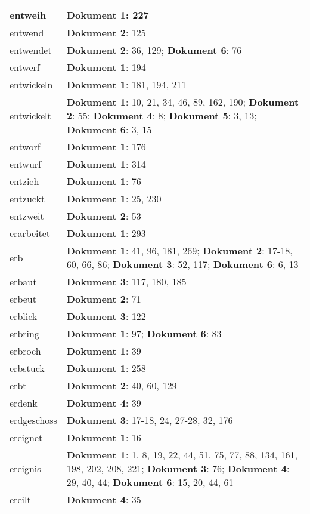 \documentclass[a5paper]{article}
\begin{document}
\begin{longtable}[l]{|l|p{3in}|}
\hline
entweih & \textbf{Dokument 1}: 227 \\
\hline
entwend & \textbf{Dokument 2}: 125 \\
\hline
entwendet & \textbf{Dokument 2}: 36, 129; \textbf{Dokument 6}: 76 \\
\hline
entwerf & \textbf{Dokument 1}: 194 \\
\hline
entwickeln & \textbf{Dokument 1}: 181, 194, 211 \\
\hline
entwickelt & \textbf{Dokument 1}: 10, 21, 34, 46, 89, 162, 190; \textbf{Dokument 2}: 55; \textbf{Dokument 4}: 8; \textbf{Dokument 5}: 3, 13; \textbf{Dokument 6}: 3, 15 \\
\hline
entworf & \textbf{Dokument 1}: 176 \\
\hline
entwurf & \textbf{Dokument 1}: 314 \\
\hline
entzieh & \textbf{Dokument 1}: 76 \\
\hline
entzuckt & \textbf{Dokument 1}: 25, 230 \\
\hline
entzweit & \textbf{Dokument 2}: 53 \\
\hline
erarbeitet & \textbf{Dokument 1}: 293 \\
\hline
erb & \textbf{Dokument 1}: 41, 96, 181, 269; \textbf{Dokument 2}: 17-18, 60, 66, 86; \textbf{Dokument 3}: 52, 117; \textbf{Dokument 6}: 6, 13 \\
\hline
erbaut & \textbf{Dokument 3}: 117, 180, 185 \\
\hline
erbeut & \textbf{Dokument 2}: 71 \\
\hline
erblick & \textbf{Dokument 3}: 122 \\
\hline
erbring & \textbf{Dokument 1}: 97; \textbf{Dokument 6}: 83 \\
\hline
erbroch & \textbf{Dokument 1}: 39 \\
\hline
erbstuck & \textbf{Dokument 1}: 258 \\
\hline
erbt & \textbf{Dokument 2}: 40, 60, 129 \\
\hline
erdenk & \textbf{Dokument 4}: 39 \\
\hline
erdgeschoss & \textbf{Dokument 3}: 17-18, 24, 27-28, 32, 176 \\
\hline
ereignet & \textbf{Dokument 1}: 16 \\
\hline
ereignis & \textbf{Dokument 1}: 1, 8, 19, 22, 44, 51, 75, 77, 88, 134, 161, 198, 202, 208, 221; \textbf{Dokument 3}: 76; \textbf{Dokument 4}: 29, 40, 44; \textbf{Dokument 6}: 15, 20, 44, 61 \\
\hline
ereilt & \textbf{Dokument 4}: 35 \\

\end{longtable}
\end{document}
